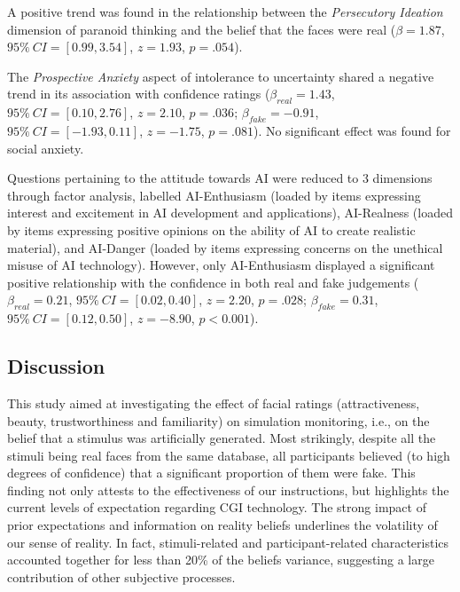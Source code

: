 \documentclass[
  man,floatsintext]{apa6}
\begin{document}
A positive trend was found in the relationship between the \emph{Persecutory Ideation} dimension of paranoid thinking and the belief that the faces were real (\(\beta = 1.87\), \(95\%~CI = [0.99, 3.54]\), \(z = 1.93\), \(p = .054\)).

The \emph{Prospective Anxiety} aspect of intolerance to uncertainty shared a negative trend in its association with confidence ratings (\(\beta_{real} = 1.43\), \(95\%~CI = [0.10, 2.76]\), \(z = 2.10\), \(p = .036\); \(\beta_{fake} = -0.91\), \(95\%~CI = [-1.93, 0.11]\), \(z = -1.75\), \(p = .081\)). No significant effect was found for social anxiety.

Questions pertaining to the attitude towards AI were reduced to 3 dimensions through factor analysis, labelled AI-Enthusiasm (loaded by items expressing interest and excitement in AI development and applications), AI-Realness (loaded by items expressing positive opinions on the ability of AI to create realistic material), and AI-Danger (loaded by items expressing concerns on the unethical misuse of AI technology). However, only AI-Enthusiasm displayed a significant positive relationship with the confidence in both real and fake judgements (\(\beta_{real} = 0.21\), \(95\%~CI = [0.02, 0.40]\), \(z = 2.20\), \(p = .028\); \(\beta_{fake} = 0.31\), \(95\%~CI = [0.12, 0.50]\), \(z = -8.90\), \(p < 0.001\)).

\hypertarget{discussion}{%
\subsection{Discussion}\label{discussion}}

This study aimed at investigating the effect of facial ratings (attractiveness, beauty, trustworthiness and familiarity) on simulation monitoring, i.e., on the belief that a stimulus was artificially generated. Most strikingly, despite all the stimuli being real faces from the same database, all participants believed (to high degrees of confidence) that a significant proportion of them were fake. This finding not only attests to the effectiveness of our instructions, but highlights the current levels of expectation regarding CGI technology. The strong impact of prior expectations and information on reality beliefs underlines the volatility of our sense of reality. In fact, stimuli-related and participant-related characteristics accounted together for less than 20\% of the beliefs variance, suggesting a large contribution of other subjective processes.
\end{document}
